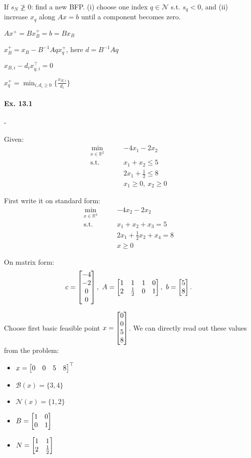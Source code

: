 \documentclass{article}
\begin{document}
If $s_N \ngeq 0$: find a new BFP. (i) choose one index $q\in \mathcal{N}$ s.t. $s_q < 0$, and (ii) increase $x_q$ along $Ax = b$ until a component becomes zero. 

$Ax^{+} = Bx_B^{+} = b = Bx_B$

\medskip $x_B^{+} = x_B - B^{-1}Aqx_q^{+}$, here $d=B^{-1}Aq$

\medskip $x_{B,i}-d_i x_{q,i}^{\top} = 0$

\medskip $x_q^{+} = \min_{i,d_i \geq 0} \{ \frac{x_{B,i}}{d_i}\}$

\begin{center}
\end{center}

\paragraph{Ex. 13.1}- 

\medskip Given:
\begin{align*}
  \min_{x \in \mathbb{R}^{2}} \qquad & -4x_1 - 2x_2 \\
  \text{s.t.}     \qquad           & x_1 + x_2 \leq 5 \\
  & 2x_1 + \frac{1}{2} \leq 8 \\
  & x_1 \geq 0,\ x_2 \geq 0
\end{align*}

First write it on standard form:
\begin{align*}
  \min_{x\in\mathbb{R}^{4}} \qquad &-4x_2-2x_2 \\
  \text{s.t.} \qquad & x_1 + x_2 + x_3 = 5 \\
  & 2x_1 + \frac{1}{2} x_2+ x_4 = 8 \\
  & x \geq 0
\end{align*}

On matrix form: 
\[
  c = \begin{bmatrix} -4 \\ -2  \\ 0 \\ 0 \end{bmatrix},\ A = \begin{bmatrix} 1 & 1 & 1 & 0 \\ 2 & \frac{1}{2} & 0 & 1 \end{bmatrix},\ b = \begin{bmatrix} 5  \\ 8 \end{bmatrix}
.\] 

Choose first basic feasible point $x = \begin{bmatrix} 0 \\ 0 \\ 5 \\ 8 \end{bmatrix}$. We can directly read out these values from the problem:

\begin{itemize}
  \item $x = \begin{bmatrix} 0  & 0 & 5 & 8 \end{bmatrix}^{\top}$
  \item $\mathcal{B}(x) = \{3, 4\}$
  \item $\mathcal{N}(x) = \{1,2\}$
  \item $B = \begin{bmatrix} 1  & 0 \\ 0 & 1 \end{bmatrix}$
  \item $N = \begin{bmatrix} 1 & 1 \\ 2 &  \frac{1}{2} \end{bmatrix}$
\end{itemize}
\end{document}
